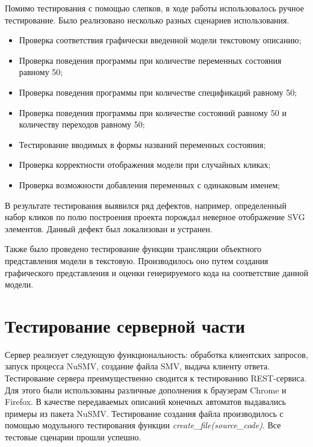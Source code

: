 Помимо тестирования с помощью слепков, в ходе работы использовалось ручное тестирование. Было реализовано несколько разных сценариев использования.

\begin{itemize}
	\item Проверка соответствия графически введенной модели текстовому описанию;
	\item Проверка поведения программы при количестве переменных состояния равному 50;
	\item Проверка поведения программы при количестве спецификаций равному 50;
	\item Проверка поведения программы при количестве состояний равному 50 и количеству переходов равному 50;
	\item Тестирование вводимых в формы названий переменных состояния;
	\item Проверка корректности отображения модели при случайных кликах;
	\item Проверка возможности добавления переменных с одинаковым именем;
\end{itemize}

В результате тестирования выявился ряд дефектов, например, определенный набор кликов по полю построения проекта порождал неверное отображение SVG элементов. Данный дефект был локализован и устранен.

Также было проведено тестирование функции трансляции объектного представления модели в текстовую. Производилось оно путем создания графического представления и оценки генерируемого кода на соответствие данной модели. 

\section{Тестирование серверной части}

Сервер реализует следующую функциональность: обработка клиентских запросов, запуск процесса NuSMV, создание файла SMV, выдача клиенту ответа. Тестирование сервера преимущественно сводится к тестированию REST-сервиса. Для этого были использованы различные дополнения к браузерам Chrome и Firefox. В качестве передаваемых описаний конечных автоматов выдавались примеры из пакета NuSMV. Тестирование создания файла производилось с помощью модульного тестирования функции \textit{create\_file(source\_code)}. Все тестовые сценарии прошли успешно.